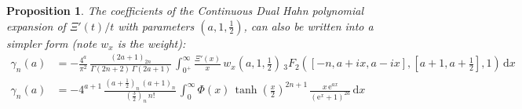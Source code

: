 \documentclass[a4paper,11pt,twoside]{amsart}
\newtheorem{proposition}[theorem]{Proposition}
\newcommand{\verifiedeq}{=}
\newcommand{\verifiedeq}{\stackrel{\checkmark}{=}}
\begin{document}
\begin{proposition}
The coefficients of the Continuous Dual Hahn polynomial expansion of $\Xi'(t)/t$ with parameters $(a,1,\frac12)$, can also be written into a simpler form (note $w_x$ is the weight):   
\begin{align}
 \gamma_n(a) &\verifiedeq -\frac{4^{a}}{\pi^2}\,\frac{\left(2a+1\right)_{2n}}{\Gamma(2n+2)\,\Gamma(2a+1)} \,\int_{0^+}^\infty \frac{\Xi'(x)}{x}\,w_x\left(a,1,\frac12\right)\,{}_3F_2\left([-n,a+ix,a-ix],\left[a+1,a+\frac12\right],1\right)\, \mathrm{d}x \\
 \gamma_n(a) &\verifiedeq -4^{a+1}\,\frac{\left(a+\frac12\right)_n\,(a+1)_n}{{\left(\frac32\right)_n\,n!}} \,\int_{0}^\infty \Phi(x)\,\tanh\left(\frac{x}{2}\right)^{2n+1}\, \frac{x\,\mathrm{e}^{ax}}{(\mathrm{e}^x+1)^{2a}}\, \mathrm{d}x \label{cdh1}
\end{align}
\end{proposition}
\end{document}
